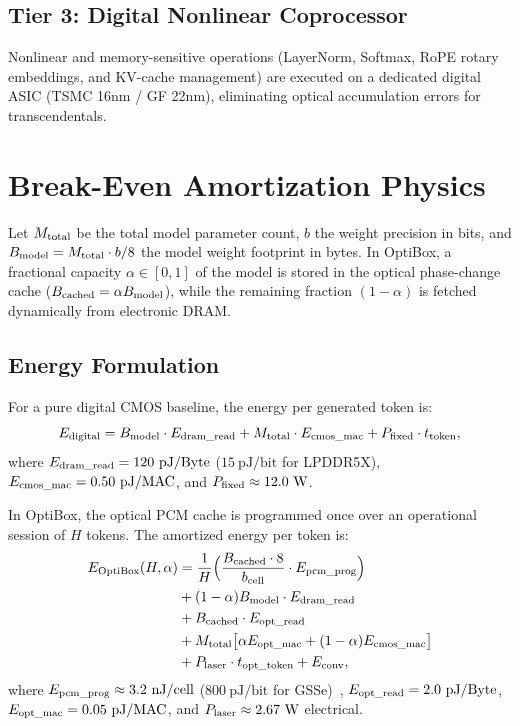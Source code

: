 \documentclass[conference]{IEEEtran}
\begin{document}
\subsection{Tier 3: Digital Nonlinear Coprocessor}
Nonlinear and memory-sensitive operations (LayerNorm, Softmax, RoPE rotary embeddings, and KV-cache management) are executed on a dedicated digital ASIC (TSMC 16nm / GF 22nm), eliminating optical accumulation errors for transcendentals.

\section{Break-Even Amortization Physics}
Let $M_{\rm total}$ be the total model parameter count, $b$ the weight precision in bits, and $B_{\rm model} = M_{\rm total} \cdot b / 8$ the model weight footprint in bytes. In OptiBox, a fractional capacity $\alpha \in [0, 1]$ of the model is stored in the optical phase-change cache ($B_{\rm cached} = \alpha B_{\rm model}$), while the remaining fraction $(1-\alpha)$ is fetched dynamically from electronic DRAM.

\subsection{Energy Formulation}
For a pure digital CMOS baseline, the energy per generated token is:
\begin{equation}
E_{\rm digital} = B_{\rm model} \cdot E_{\rm dram\_read} + M_{\rm total} \cdot E_{\rm cmos\_mac} + P_{\rm fixed} \cdot t_{\rm token},
\end{equation}
where $E_{\rm dram\_read} = 120~\text{pJ/Byte}$ ($15~\text{pJ/bit}$ for LPDDR5X), $E_{\rm cmos\_mac} = 0.50~\text{pJ/MAC}$, and $P_{\rm fixed} \approx 12.0~\text{W}$.

In OptiBox, the optical PCM cache is programmed once over an operational session of $H$ tokens. The amortized energy per token is:
\begin{align}
E_{\rm OptiBox}(H, \alpha) &= \frac{1}{H} \Big( \frac{B_{\rm cached} \cdot 8}{b_{\rm cell}} \cdot E_{\rm pcm\_prog} \Big) \nonumber \\
&+ (1-\alpha) B_{\rm model} \cdot E_{\rm dram\_read} \nonumber \\
&+ B_{\rm cached} \cdot E_{\rm opt\_read} \nonumber \\
&+ M_{\rm total} \big[ \alpha E_{\rm opt\_mac} + (1-\alpha) E_{\rm cmos\_mac} \big] \nonumber \\
&+ P_{\rm laser} \cdot t_{\rm opt\_token} + E_{\rm conv},
\end{align}
where $E_{\rm pcm\_prog} \approx 3.2~\text{nJ/cell}$ ($800~\text{pJ/bit}$ for GSSe)~\cite{Meng2023,Fang2022}, $E_{\rm opt\_read} = 2.0~\text{pJ/Byte}$, $E_{\rm opt\_mac} = 0.05~\text{pJ/MAC}$, and $P_{\rm laser} \approx 2.67~\text{W}$ electrical.
\end{document}

